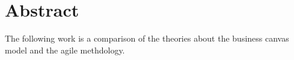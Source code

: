 \chapter{Abstract}
\par{
The following work is a comparison of the theories about the business canvas model and the agile methdology. 
}